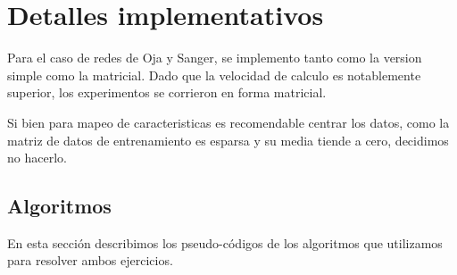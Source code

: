 \section{Detalles implementativos}
Para el caso de redes de Oja y Sanger, se implemento tanto como la version simple como la matricial. Dado que la velocidad de calculo es notablemente superior, los experimentos se corrieron en forma matricial.

Si bien para mapeo de caracteristicas es recomendable centrar los datos, como la matriz de datos de entrenamiento es esparsa y su media tiende a cero, decidimos no hacerlo.

\subsection{Algoritmos}
En esta sección describimos los pseudo-códigos de los algoritmos que utilizamos para resolver ambos ejercicios.

\begin{center}
\noindent{}
\end{center}



\begin{center}
\noindent{}
\end{center}



